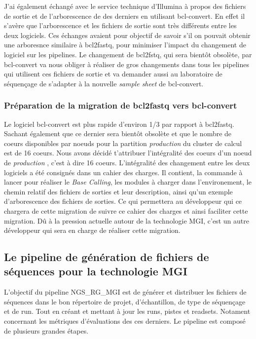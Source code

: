 J'ai également échangé avec le service technique d'Illumina à propos des fichiers de sortie et de l'arborescence de des derniers en utilisant bcl-convert. En effet il s'avère que l'arborescence et les fichiers de sortie sont très différents entre les deux logiciels. Ces échanges avaient pour objectif de savoir s'il on pouvait obtenir une arboresnce similaire à bcl2fastq, pour minimiser l'impact du changement de logiciel sur les pipelines. Le changement de bcl2fstq, qui sera bientôt obsolète, par bcl-convert va nous obliger à réaliser de gros changements dans tous les pipelines qui utilisent ces fichiers de sortie et va demander aussi au laboratoire de séquençage de s'adapter à la nouvelle \emph{sample sheet} de bcl-convert.

\subsubsection{Préparation de la migration de bcl2fastq vers bcl-convert}
Le logiciel bcl-convert est plus rapide d'environ 1/3 par rapport à bcl2fastq. Sachant également que ce dernier sera bientôt obsolète et que le nombre de coeurs disponibles par noeuds pour la partition \og \emph{production} \fg{}du cluster de calcul est de 16 coeurs. Nous avons décidé t'attribuer l'intégralité des coeurs d'un noeud de \og\emph{production} \fg{}, c'est à dire 16 coeurs. L'intégralité des changement entre les deux logiciels a été consignés dans un cahier des charges. Il contient, la commande à lancer pour réaliser le \emph{Base Calling}, les modules à charger dans l'environement, le chemin relatif des fichiers de sorties et leur description, ainsi qu'un exemple d'arborescence des fichiers de sorties. Ce qui permettera au développeur qui ce chargera de cette migration de suivre ce cahier des charges et ainsi faciliter cette migration. Dû à la pression actuelle autour de la technologie MGI, c'est un autre développeur qui sera en charge de réaliser cette migration.


\subsection{Le pipeline de génération de fichiers de séquences pour la technologie MGI}
L'objectif du pipeline NGS\_RG\_MGI est de générer et distribuer les fichiers de séquences dans le bon répertoire de projet, d'échantillon, de type de séquençage et de run.
Tout en créant et mettant à jour les runs, pistes et readsets.
Notament concernant les métriques d'évaluations des ces derniers.
Le pipeline est composé de plusieurs grandes étapes.


